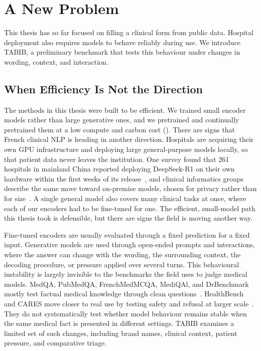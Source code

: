 \chapter{A New Problem}
\label{sec:conclusion-evaluation}

This thesis has so far focused on filling a clinical form from public data.
Hospital deployment also requires models to behave reliably during use. We
introduce TABIB, a preliminary benchmark that tests this behaviour under changes
in wording, context, and interaction.

\section{When Efficiency Is Not the Direction}

The methods in this thesis were built to be efficient. We trained small encoder
models rather than large generative ones, and we pretrained and continually
pretrained them at a low compute and carbon cost ().
There are signs that French clinical NLP is heading in another direction. Hospitals are
acquiring their own GPU infrastructure and deploying large general-purpose models
locally, so that patient data never leaves the institution. One survey found that
261 hospitals in mainland China reported deploying DeepSeek-R1 on
their own hardware within the first weeks of its release~\citep{yuan2025deepseek},
and clinical informatics groups describe the same move toward on-premise models,
chosen for privacy rather than for size~\citep{dennstadt2025implementing}. A single
general model also covers many clinical tasks at once, where each of our encoders had
to be fine-tuned for one. The efficient, small-model path this thesis took is
defensible, but there are signs the field is moving another way.

Fine-tuned encoders are usually evaluated through a fixed prediction for a fixed
input. Generative models are used through open-ended prompts and interactions,
where the answer can change with the wording, the surrounding context, the
decoding procedure, or pressure applied over several turns.
This behavioural instability is largely invisible to the benchmarks the field uses
to judge medical models. MedQA, PubMedQA, FrenchMedMCQA, MediQAl, and DrBenchmark
mostly test factual medical knowledge through clean
questions~\citep{jin2021medqa,jin2019pubmedqa,labrak-etal-2022,mediqal2026,drbenchmark2024}.
HealthBench and CARES move closer to real use by testing safety and refusal at
larger scale~\citep{arora2025healthbench,chen2025cares}. They do not
systematically test whether model behaviour remains stable when the same medical
fact is presented in different settings. TABIB examines a limited set of such
changes, including brand names, clinical context, patient pressure, and
comparative triage.

